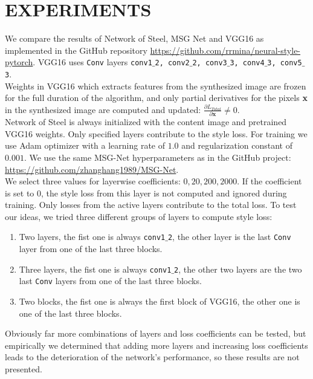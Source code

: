 \documentclass[a4paper,twoside]{article}
\begin{document}
\section{\uppercase{Experiments}}
\label{sec:exps}
\noindent We compare the results of Network of Steel, MSG Net and VGG16 as implemented in the GitHub repository  \url{https://github.com/rrmina/neural-style-pytorch}. VGG16 uses \texttt{Conv} layers \texttt{conv1${}\_{}$2, conv2${}\_{}$2, conv3${}\_{}$3, conv4${}\_{}$3, conv5${}\_{}$3}. \\

\noindent Weights in VGG16 which extracts features from the synthesized image are frozen for the full duration of the algorithm, and only partial derivatives for the pixels \textbf{x} in the synthesized image are computed and updated: $\frac{\partial L_{Total}}{\partial \mathbf{x}} \neq 0$.\\

\noindent Network of Steel is always initialized with the content image and pretrained VGG16 weights. Only specified layers contribute to the style loss. For training we use Adam optimizer with a learning rate of $1.0$ and regularization constant of $0.001$. We use the same MSG-Net hyperparameters as in the GitHub project: \url{https://github.com/zhanghang1989/MSG-Net}.\\

\noindent We select three values for layerwise coefficients: $0, 20, 200, 2000$. If the coefficient is set to $0$, the style loss from this layer is not computed and ignored during training. Only losses from the active layers contribute to the total loss. To test our ideas, we tried three different groups of layers to compute style loss:
\begin{enumerate}
    \item Two layers, the fist one is always \texttt{conv1${}\_{}$2}, the other layer is the last \texttt{Conv} layer from one of the last three blocks. 
    \item Three layers, the fist one is always \texttt{conv1${}\_{}$2}, the other two layers are the two last \texttt{Conv} layers from one of the last three blocks. 
    \item Two blocks, the fist one is always the first block of VGG16, the other one is one of the last three blocks. 
\end{enumerate}

Obviously far more combinations of layers and loss coefficients can be tested, but empirically we determined that adding more layers and increasing loss coefficients leads to the deterioration of the network's performance, so these results are not presented. 
\end{document}
